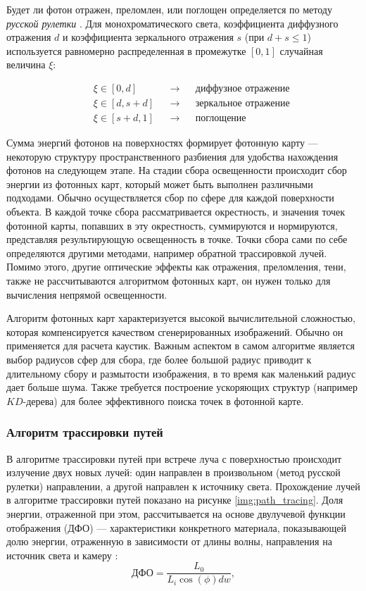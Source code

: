 Будет ли фотон отражен, преломлен, или поглощен определяется по методу \textit{русской рулетки} \cite{jensen_gi}. Для монохроматического света, коэффициента диффузного отражения $d$ и коэффициента зеркального отражения $s$ (при $d+s\leq1$) используется равномерно распределенная в промежутке $[0,1]$ случайная величина $\xi$:

\begin{equation}
	\begin{aligned}
		&&\xi \in [0,d] \quad\ \  && \rightarrow && \text{диффузное отражение} \\
		&&\xi \in [d,s + d] && \rightarrow && \text{зеркальное отражение} \\
		&&\xi \in [s+d,1] && \rightarrow && \text{поглощение}
	\end{aligned}
\end{equation}

Сумма энергий фотонов на поверхностях формирует фотонную карту --- некоторую структуру пространственного разбиения для удобства нахождения фотонов на следующем этапе. На стадии сбора освещенности происходит сбор энергии из фотонных карт, который может быть выполнен различными подходами. Обычно осуществляется сбор по сфере для каждой поверхности объекта. В каждой точке сбора рассматривается окрестность, и значения точек фотонной карты, попавших в эту окрестность, суммируются и нормируются, представляя результирующую освещенность в точке. Точки сбора сами по себе определяются другими методами, например обратной трассировкой лучей. Помимо этого, другие оптические эффекты как отражения, преломления, тени, также не рассчитываются алгоритмом фотонных карт, он нужен только для вычисления непрямой освещенности.

Алгоритм фотонных карт характеризуется высокой вычислительной сложностью, которая компенсируется качеством сгенерированных изображений. Обычно он применяется для расчета каустик. Важным аспектом в самом алгоритме является выбор радиусов сфер для сбора, где более большой радиус приводит к длительному сбору и размытости изображения, в то время как маленький радиус дает больше шума. Также требуется построение ускоряющих структур (например $KD$-дерева) для более эффективного поиска точек в фотонной карте.

\subsubsection{Алгоритм трассировки путей}

В алгоритме трассировки путей \cite{kalos_phd} при встрече луча с поверхностью происходит излучение двух новых лучей: один направлен в произвольном (метод русской рулетки) направлении, а другой направлен к источнику света. Прохождение лучей в алгоритме трассировки путей показано на рисунке \ref{img:path_tracing}. Доля энергии, отраженной при этом, рассчитывается на основе двулучевой функции отображения (ДФО) --- характеристики конкретного материала, показывающей долю энергии, отраженную в зависимости от длины волны, направления на источник света и камеру \cite{ilyin_modeling, kalos_phd}:
\begin{equation}
	\label{eq:DFO}
	\text{ДФО} = \frac{L_0}{L_i \cos(\phi) dw},
\end{equation}

